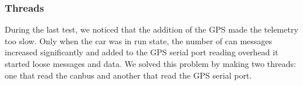 \subsubsection{Threads}
During the last test, we noticed that the addition of the GPS made the telemetry too slow. Only when the car was in run state, the number
of can messages increased significantly and added to the GPS serial port reading overhead it started loose messages and data. We solved this
problem by making two threads: one that read the canbus and another that read the GPS serial port.

